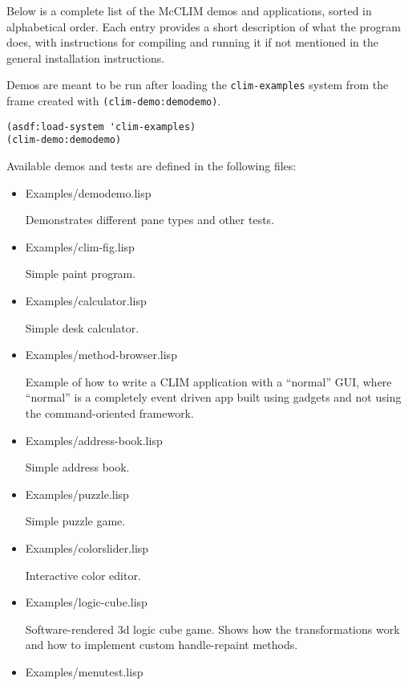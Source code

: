 Below is a complete list of the McCLIM demos and applications, sorted in
alphabetical order.  Each entry provides a short description of what the
program does, with instructions for compiling and running it if not
mentioned in the general installation instructions.

Demos are meant to be run after loading the \texttt{clim-examples}
system from the frame created with \texttt{(clim-demo:demodemo)}.

\begin{verbatim}
(asdf:load-system 'clim-examples)
(clim-demo:demodemo)
\end{verbatim}

Available demos and tests are defined in the following files:

\begin{itemize}
\item Examples/demodemo.lisp

  Demonstrates different pane types and other tests.

\item Examples/clim-fig.lisp

  Simple paint program.

\item Examples/calculator.lisp

  Simple desk calculator.

\item Examples/method-browser.lisp

  Example of how to write a CLIM application with a ``normal'' GUI,
  where ``normal'' is a completely event driven app built using
  gadgets and not using the command-oriented framework.

\item Examples/address-book.lisp

  Simple address book.

\item Examples/puzzle.lisp

  Simple puzzle game.

\item Examples/colorslider.lisp

  Interactive color editor.

\item Examples/logic-cube.lisp

  Software-rendered 3d logic cube game. Shows how the transformations
  work and how to implement custom handle-repaint methods.

\item Examples/menutest.lisp


\end{itemize}
